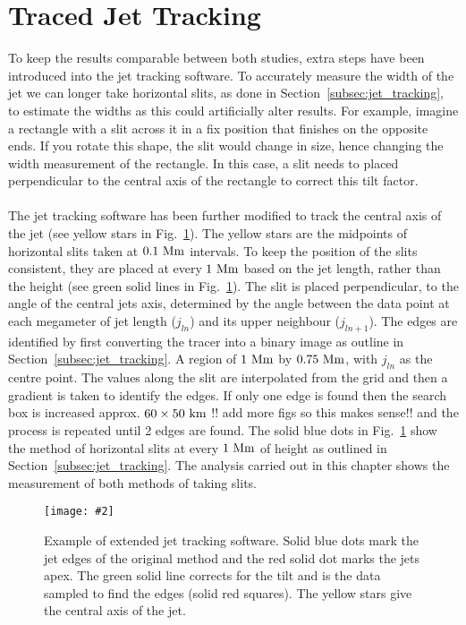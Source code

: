 \documentclass[12pt]{ociamthesis}
\newcommand{\mfig}[4]{
  \begin{figure}
  \begin{center}
  \texttt{[image: \#2]}
  \caption{#3}
  \label{#4}
  \end{center}
  \end{figure}}
\newcommand{\np}{\\ \\}
\begin{document}
\section{Traced Jet Tracking}
\label{sec:tjt}
To keep the results comparable between both studies, extra steps have been introduced into the jet tracking software. To accurately measure the width of the jet we can longer take horizontal slits, as done in Section~\ref{subsec:jet_tracking}, to estimate the widths as this could artificially alter results. For example, imagine a rectangle with a slit across it in a fix position that finishes on the opposite ends. If you rotate this shape, the slit would change in size, hence changing the width measurement of the rectangle. In this case, a slit needs to placed perpendicular to the central axis of the rectangle to correct this tilt factor. \np
%
The jet tracking software has been further modified to track the central axis of the jet (see yellow stars in Fig.~\ref{imporved_j_track_example}). The yellow stars are the midpoints of horizontal slits taken at $0.1~\rm{Mm}$ intervals. To keep the position of the slits consistent, they are placed at every $1~\rm{Mm}$ based on the jet length, rather than the height (see green solid lines in Fig.~\ref{imporved_j_track_example}). The slit is placed perpendicular, to the angle of the central jets axis, determined by the angle between the data point at each megameter of jet length ($j_{ln}$) and its upper neighbour ($j_{ln+1}$). The edges are identified by first converting the tracer into a binary image as outline in Section~\ref{subsec:jet_tracking}. A region of $1~\rm{Mm}$ by $0.75~\rm{Mm}$, with $j_{ln}$ as the centre point. The values along the slit are interpolated from the grid and then a gradient is taken to identify the edges. If only one edge is found then the search box is increased approx. $60\times 50~\rm{km}$ {\color{green} !! add more figs so this makes sense!!} and the process is repeated until 2 edges are found. The solid blue dots in  Fig.~\ref{imporved_j_track_example} show the method of horizontal slits at every $1~\rm{Mm}$ of height as outlined in Section~\ref{subsec:jet_tracking}. The analysis carried out in this chapter shows the measurement of both methods of taking slits. 
\mfig{1}{figures/jet_P300_B60A_60T_0039.png}{Example of extended jet tracking software. Solid blue dots mark the jet edges of the original method and the red solid dot marks the jets apex. The green solid line corrects for the tilt and is the data sampled to find the edges (solid red squares). The yellow stars give the central axis of the jet.}{imporved_j_track_example}
\end{document}
